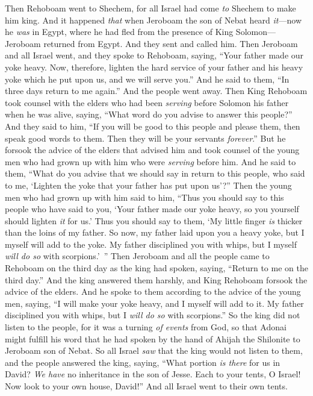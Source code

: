\begin{biblechapter} %
 Then Rehoboam went to Shechem, for all Israel had come \textit{to} Shechem to make him king.
\verse And it happened \textit{that} when Jeroboam the son of Nebat heard \textit{it}—now he \textit{was} in Egypt, where he had fled from the presence of King Solomon—Jeroboam returned from Egypt.
\verse And they sent and called him. Then Jeroboam and all Israel went, and they spoke to Rehoboam, saying,
\verse “Your father made our yoke heavy. Now, therefore, lighten the hard service of your father and his heavy yoke which he put upon us, and we will serve you.”
\verse And he said to them, “In three days return to me again.” And the people went away.
\verse Then King Rehoboam took counsel with the elders who had been \textit{serving} before Solomon his father when he was alive, saying, “What word do you advise to answer this people?”
\verse And they said to him, “If you will be good to this people and please them, then speak good words to them. Then they will be your servants \textit{forever}.”
\verse But he forsook the advice of the elders that advised him and took counsel of the young men who had grown up with him who were \textit{serving} before him.
\verse And he said to them, “What do you advise that we should say in return to this people, who said to me, ‘Lighten the yoke that your father has put upon us’?”
\verse Then the young men who had grown up with him said to him, “Thus you should say to this people who have said to you, ‘Your father made our yoke heavy, so you yourself should lighten \textit{it} for us.’ Thus you should say to them, ‘My little finger \textit{is} thicker than the loins of my father.
\verse So now, my father laid upon you a heavy yoke, but I myself will add to the yoke. My father disciplined you with whips, but I myself \textit{will do so} with scorpions.’ ”
\verse Then Jeroboam and all the people came to Rehoboam on the third day as the king had spoken, saying, “Return to me on the third day.”
\verse And the king answered them harshly, and King Rehoboam forsook the advice of the elders.
\verse And he spoke to them according to the advice of the young men, saying, “I will make your yoke heavy, and I myself will add to it. My father disciplined you with whips, but I \textit{will do so} with scorpions.”
\verse So the king did not listen to the people, for it was a turning \textit{of events} from God, so that Adonai might fulfill his word that he had spoken by the hand of Ahijah the Shilonite to Jeroboam son of Nebat.
\verse So all Israel \textit{saw} that the king would not listen to them, and the people answered the king, saying, “What portion \textit{is there} for us in David? \textit{We have} no inheritance in the son of Jesse. Each to your tents, O Israel! Now look to your own house, David!” And all Israel went to their own tents.

\end{biblechapter}
